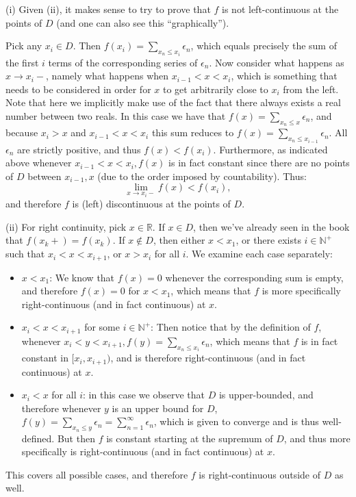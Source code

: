 \begin{solution}

    (i) Given (ii), it makes sense to try to prove that $f$ is not left-continuous at the points of $D$ (and one can also see this ``graphically'').

    Pick any $x_i \in D$.
    Then $f(x_i) = \sum_{x_n \leq x_i} \epsilon_n$, which equals precisely the sum of the first $i$ terms of the corresponding series of $\epsilon_n$.
    Now consider what happens as $x \rightarrow x_i-$, namely what happens when $x_{i-1} < x < x_i$, which is something that needs to be considered in order for $x$ to get arbitrarily close to $x_i$ from the left.
    Note that here we implicitly make use of the fact that there always exists a real number between two reals.
    In this case we have that $f(x) = \sum_{x_n \leq x} \epsilon_n$, and because $x_i > x$ and $x_{i-1} < x < x_i$ this sum reduces to $f(x) = \sum_{x_n \leq x_{i-1}} \epsilon_n$.
    All $\epsilon_n$ are strictly positive, and thus $f(x) < f(x_i)$.
    Furthermore, as indicated above whenever $x_{i-1} < x < x_i, f(x)$ is in fact constant since there are no points of $D$ between $x_{i-1}, x$ (due to the order imposed by countability).
    Thus:
    $$\lim_{x \rightarrow x_i-} f(x) < f(x_i),$$
    and therefore $f$ is (left) discontinuous at the points of $D$.

    (ii) For right continuity, pick $x \in \mathbb{R}$.
    If $x \in D$, then we've already seen in the book that $f(x_k+) = f(x_k)$.
    If $x \notin D$, then either $x < x_1$, or there exists $i \in \mathbb{N}^+$ such that $x_{i} < x < x_{i+1}$, or $x > x_i$ for all $i$. 
    We examine each case separately:
    \begin{itemize}
        \item $x < x_1$: We know that $f(x) = 0$ whenever the corresponding sum is empty, and therefore $f(x) = 0$ for $x < x_1$, which means that $f$ is more specifically right-continuous (and in fact continuous) at $x$.
        \item $x_i < x < x_{i+1}$ for some $i \in \mathbb{N}^+$: Then notice that by the definition of $f$, whenever $x_i < y < x_{i+1}, f(y) = \sum_{x_n \leq x_i} \epsilon_n$, which means that $f$ is in fact constant in $[x_i, x_{i+1})$, and is therefore right-continuous (and in fact continuous) at $x$.
        \item $x_i < x$ for all $i$: in this case we observe that $D$ is upper-bounded, and therefore whenever $y$ is an upper bound for $D$, $f(y) = \sum_{x_n \leq y} \epsilon_n = \sum_{n=1}^{\infty} \epsilon_n$, which is given to converge and is thus well-defined.
        But then $f$ is constant starting at the supremum of $D$, and thus more specifically is right-continuous (and in fact continuous) at $x$.
    \end{itemize}
    This covers all possible cases, and therefore $f$ is right-continuous outside of $D$ as well.


\end{solution}

